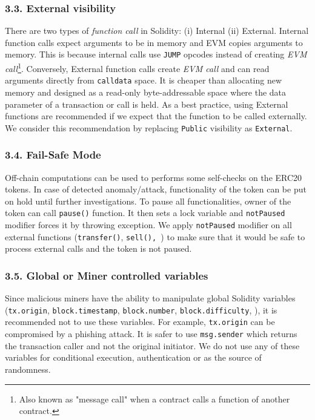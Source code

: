 \subsubsection*{3.3. External visibility}
There are two types of \textit{function call} in Solidity\cite{SolidityDoc}: (i) Internal (ii) External. Internal function calls expect arguments to be in memory and EVM copies arguments to memory. This is because internal calls use \texttt{JUMP} opcodes instead of creating \textit{EVM call}\footnote{Also known as "message call" when a contract calls a function of another contract.}. Conversely, External function calls create \textit{EVM call} and can read arguments directly from \texttt{calldata} space. It is cheaper than allocating new memory and designed as a read-only byte-addressable space where the data parameter of a transaction or call is held\cite{EthInDepth}. As a best practice, using External functions are recommended if we expect that the function to be called externally. We consider this recommendation by replacing \texttt{Public} visibility as \texttt{External}.

\subsubsection*{3.4. Fail-Safe Mode}
Off-chain computations can be used to performs some self-checks on the ERC20 tokens. In case of detected anomaly/attack, functionality of the token can be put on hold until further investigations. To pause all functionalities, owner of the token can call \texttt{pause()} function. It then sets a lock variable and \texttt{notPaused} modifier forces it by throwing exception. We apply \texttt{notPaused} modifier on all external functions (\eg \texttt{transfer()}, \texttt{sell(), \etc}) to make sure that it would be safe to process external calls and the token is not paused.

\subsubsection*{3.5. Global or Miner controlled variables}
Since malicious miners have the ability to manipulate global Solidity variables (\eg \texttt{tx.origin}, \texttt{block.timestamp}, \texttt{block.number}, \texttt{block.difficulty}, \etc), it is recommended not to use these variables. For example, \texttt{tx.origin} can be compromised by a phishing attack. It is safer to use \texttt{msg.sender} which returns the transaction caller and not the original initiator. We do not use any of these variables for conditional execution, authentication or as the source of randomness.

